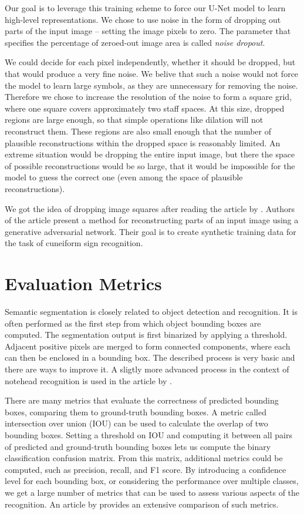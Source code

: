 Our goal is to leverage this training scheme to force our U-Net model to learn high-level representations. We chose to use noise in the form of dropping out parts of the input image -- setting the image pixels to zero. The parameter that specifies the percentage of zeroed-out image area is called \emph{noise dropout}.

We could decide for each pixel independently, whether it should be dropped, but that would produce a very fine noise. We belive that such a noise would not force the model to learn large symbols, as they are unnecessary for removing the noise. Therefore we chose to increase the resolution of the noise to form a square grid, where one square covers approximately two staff spaces. At this size, dropped regions are large enough, so that simple operations like dilation will not reconstruct them. These regions are also small enough that the number of plausible reconstructions within the dropped space is reasonably limited. An extreme situation would be dropping the entire input image, but there the space of possible reconstructions would be so large, that it would be impossible for the model to guess the correct one (even among the space of plausible reconstructions).

We got the idea of dropping image squares after reading the article by \cite{Cuneiforms}. Authors of the article present a method for reconstructing parts of an input image using a generative adversarial network. Their goal is to create synthetic training data for the task of cuneiform sign recognition.


\section{Evaluation Metrics}
\label{sec:EvaluationMetrics}

Semantic segmentation is closely related to object detection and recognition. It is often performed as the first step from which object bounding boxes are computed. The segmentation output is first binarized by applying a threshold. Adjacent positive pixels are merged to form connected components, where each can then be enclosed in a bounding box. The described process is very basic and there are ways to improve it. A sligtly more advanced process in the context of notehead recognition is used in the article by \cite{DorferEtAl}.

There are many metrics that evaluate the correctness of predicted bounding boxes, comparing them to ground-truth bounding boxes. A metric called intersection over union (IOU) can be used to calculate the overlap of two bounding boxes. Setting a threshold on IOU and computing it between all pairs of predicted and ground-truth bounding boxes lets us compute the binary classification confusion matrix. From this matrix, additional metrics could be computed, such as precision, recall, and F1 score. By introducing a confidence level for each bounding box, or considering the performance over multiple classes, we get a large number of metrics that can be used to assess various aspects of the recognition. An article by \cite{PadillaMetrics} provides an extensive comparison of such metrics.

